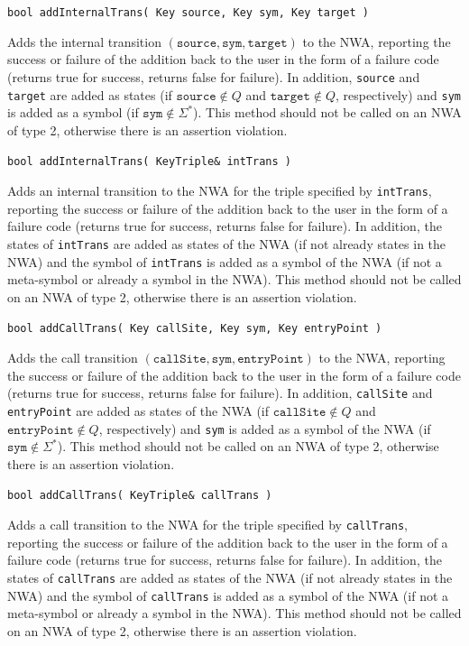 \documentclass{llncs}
\begin{document}
\begin{description}

  \item\texttt{bool addInternalTrans( Key source, Key sym, Key target )}

    Adds the internal transition $(\texttt{source},\texttt{sym},\texttt{target})$ to the NWA, reporting the success or failure of the addition back to the user in the form of a failure code (returns true for success, returns false for failure).  In addition, \texttt{source} and \texttt{target} are added as states (if $\texttt{source} \not\in Q$ and $\texttt{target} \not\in Q$, respectively) and \texttt{sym} is added as a symbol (if $\texttt{sym} \not\in \Sigma^*$).  This method should not be called on an NWA of type 2, otherwise there is an assertion violation.

  \item\texttt{bool addInternalTrans( KeyTriple\& intTrans )}

    Adds an internal transition to the NWA for the triple specified by \texttt{intTrans}, reporting the success or failure of the addition back to the user in the form of a failure code (returns true for success, returns false for failure).  In addition, the states of \texttt{intTrans} are added as states of the NWA (if not already states in the NWA) and the symbol of \texttt{intTrans} is added as a symbol of the NWA (if not a meta-symbol or already a symbol in the NWA).  This method should not be called on an NWA of type 2, otherwise there is an assertion violation.

  \item\texttt{bool addCallTrans( Key callSite, Key sym, Key entryPoint )}

    Adds the call transition $(\texttt{callSite},\texttt{sym},\texttt{entryPoint})$ to the NWA, reporting the success or failure of the addition back to the user in the form of a failure code (returns true for success, returns false for failure).  In addition, \texttt{callSite} and \texttt{entryPoint} are added as states of the NWA (if $\texttt{callSite} \not\in Q$ and $\texttt{entryPoint} \not\in Q$, respectively) and \texttt{sym} is added as a symbol of the NWA (if $\texttt{sym} \not\in \Sigma^*$).  This method should not be called on an NWA of type 2, otherwise there is an assertion violation.

  \item\texttt{bool addCallTrans( KeyTriple\& callTrans )}

    Adds a call transition to the NWA for the triple specified by \texttt{callTrans}, reporting the success or failure of the addition back to the user in the form of a failure code (returns true for success, returns false for failure).  In addition, the states of \texttt{callTrans} are added as states of the NWA (if not already states in the NWA) and the symbol of \texttt{callTrans} is added as a symbol of the NWA (if not a meta-symbol or already a symbol in the NWA).  This method should not be called on an NWA of type 2, otherwise there is an assertion violation.


\end{description}
\end{document}
